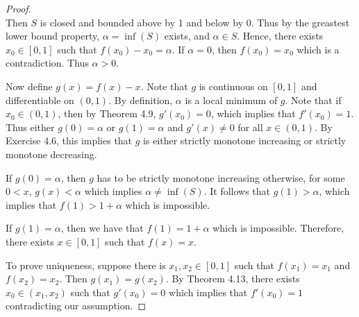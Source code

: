 \documentclass[12pt]{article}
\theoremstyle{definition}
\begin{document}
\begin{enumerate}
\begin{proof}
\begin{equation*}
                            \end{equation*}
                        Then $S$ is closed and bounded above by 1 and below
                        by 0. Thus by the greastest lower bound property,
                        $\alpha=\inf(S)$ exists, and $\alpha\in S$. Hence,
                        there exists $x_0\in[0, 1]$ such that
                        $f(x_0)-x_0=\alpha$. If
                        $\alpha=0$, then $f(x_0)=x_0$ which is
                        a contradiction. Thus $\alpha>0$. \par\hspace{4mm} Now
                        define $g(x)=f(x)-x$. Note that $g$ is continuous on
                        $[0, 1]$ and differentiable on $(0, 1)$. By definition,
                        $\alpha$ is a local minimum of $g$. Note that if
                        $x_0\in(0, 1)$, then by Theorem 4.9, $g'(x_0)=0$,
                        which implies that $f'(x_0)=1$. Thus either
                        $g(0)=\alpha$ or $g(1)=\alpha$ and $g'(x)\neq 0$
                        for all $x\in(0, 1)$. By Exercise 4.6, this implies
                        that $g$ is either strictly monotone increasing or
                        strictly monotone
                        decreasing.\par\hspace{4mm} If $g(0)=\alpha$, then $g$ has to be
                        strictly monotone increasing otherwise, for some
                        $0<x$, $g(x)<\alpha$ which implies
                        $\alpha\neq\inf(S)$. It follows that $g(1)>\alpha$, which
                        implies that $f(1)>1+\alpha$ which is
                        impossible.\par\hspace{4mm} If $g(1)=\alpha$, then
                        we have that $f(1)=1+\alpha$ which is impossible.
                        Therefore, there exists $x\in[0, 1]$ such that
                        $f(x)=x$. \par\hspace{4mm} To prove uniqueness,
                        suppose there is $x_1, x_2\in[0, 1]$ such that
                        $f(x_1)=x_1$ and $f(x_2)=x_2$. Then
                        $g(x_1)=g(x_2)$. By Theorem 4.13, there exists
                        $x_0\in(x_1, x_2)$ such that $g'(x_0)=0$ which
                        implies that $f'(x_0)=1$ contradicting our
                        assumption.
                    \end{proof}

\end{enumerate}
\end{document}
